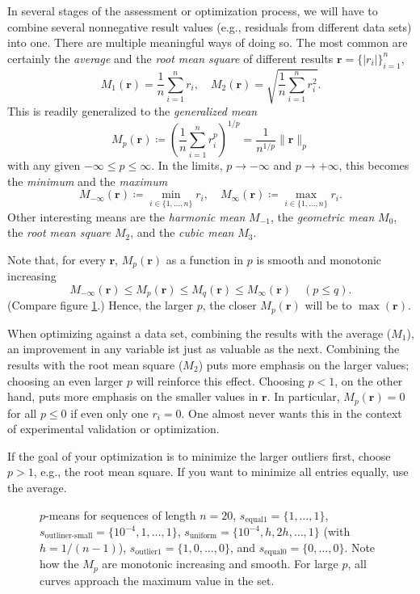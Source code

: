 \documentclass{scrartcl}
\theoremstyle{named}
\newcommand\rr{\ensuremath{\bm{r}}}
\begin{document}
In several stages of the assessment or optimization process, we will have to combine
several nonnegative result values (e.g., residuals from different data sets) into one.
There are multiple meaningful ways of doing so. The most common are certainly the
\emph{average} and the \emph{root mean square} of different results
$\rr = \{|r_i|\}_{i=1}^n$,
\[
  M_1(\rr) = \frac{1}{n}\sum_{i=1}^n r_i,\quad
  M_2(\rr) = \sqrt{\frac{1}{n}\sum_{i=1}^n r_i^2}.
\]
This is readily generalized to the
\emph{generalized mean}
\[
  M_p(\rr) \coloneqq \left(\frac{1}{n}\sum_{i=1}^n r_i^p\right)^{1/p} =
  \frac{1}{n^{1/p}} \|\rr\|_p
\]
with any given $-\infty \le p \le \infty$. In the limits, $p\to-\infty$ and
$p\to +\infty$, this becomes the \emph{minimum} and the \emph{maximum}
\[
  M_{-\infty}(\rr) \coloneqq \min_{i\in\{1,\dots,n\}} r_i, \quad
  M_{\infty}(\rr) \coloneqq \max_{i\in\{1,\dots,n\}} r_i.
\]
Other interesting means are the \emph{harmonic mean} $M_{-1}$, the \emph{geometric mean}
$M_0$, the \emph{root mean square} $M_2$, and the \emph{cubic mean} $M_3$.

Note that, for every $\rr$, $M_p(\rr)$ as a function in $p$ is smooth and monotonic
increasing
\[
  M_{-\infty}(\rr) \le M_p(\rr) \le M_q(\rr) \le M_{\infty}(\rr) \quad (p\le q).
\]
(Compare figure \ref{fig:1}.)
Hence, the larger $p$, the closer $M_p(\rr)$ will be to $\max(\rr)$.

When optimizing against a data set, combining the results with the average ($M_1$), an
improvement in any variable ist just as valuable as the next. Combining the results with
the root mean square ($M_2$) puts more emphasis on the larger values; choosing an even
larger $p$ will reinforce this effect. Choosing $p < 1$, on the other hand, puts more
emphasis on the smaller values in $\rr$.  In particular, $M_p(\rr)=0$ for all $p\le 0$
if even only one $r_i=0$. One almost never wants this in the context of experimental
validation or optimization.

If the goal of your optimization is to minimize the larger outliers first, choose $p>1$,
e.g., the root mean square. If you want to minimize all entries equally, use the
average.

\begin{figure}
  \centering
  
  \caption{$p$-means for sequences of length $n=20$, $s_\text{equal1} = \{1, \dots,
  1\}$, $s_\text{outliner-small} = \{10^{-4}, 1,\dots, 1\}$, $s_\text{uniform} =
  \{10^{-4}, h, 2h, \dots, 1\}$ (with $h = 1 / (n-1)$), $s_\text{outlier1} = \{1,
  0,\dots, 0\}$, and $s_\text{equal0} = \{0,\dots,0\}$. Note how the $M_p$ are monotonic
  increasing and smooth. For large $p$, all curves approach the maximum value in the
  set.}
  \label{fig:1}
\end{figure}
\end{document}
